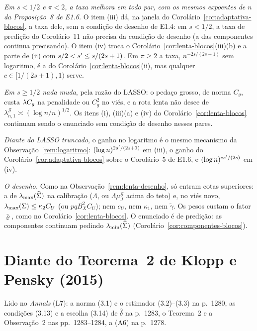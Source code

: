 \documentclass[11pt,a4paper]{article}
\newcommand{\lmin}{\lambda_{\min}}
\newcommand{\lmaxx}{\lambda_{\max}}
\newcommand{\gtil}{\widetilde{\gamma}}
\newcommand{\Gcal}{\mathcal{G}}
\newcommand{\lamGone}{\lambda^{\mathcal{G}}_{n,1}}
\begin{document}
\begin{remark}\label{rem:truncada-blocos}
\emph{Em $s < 1/2$ e $\pi < 2$, a taxa melhora em todo par, com os mesmos
expoentes de $n$ da Proposição~8 de E1.6.} O item (iii) dá, na janela do
Corolário~\ref{cor:adaptativa-blocos}, a taxa dele, sem a condição de desenho
de E1.4: em $s < 1/2$, a taxa de predição do Corolário~11 não precisa da
condição de desenho (a das componentes continua precisando). O item (iv) troca o Corolário~\ref{cor:lenta-blocos}(iii)(b) e a
parte de (ii) com $s/2 < s' \le s/(2s+1)$. Em $\pi \ge 2$ a taxa,
$n^{-2s/(2s+1)}$ sem logaritmo, é a do Corolário~\ref{cor:lenta-blocos}(ii),
mas qualquer $c \in [1/(2s+1),1)$ serve.

\emph{Em $s \ge 1/2$ nada muda}, pela razão do LASSO: o pedaço grosso, de
norma $C_{g}$, custa $\lambda C_{g}$ na penalidade ou $C_{g}^{2}$ no viés, e a
rota lenta não desce de $\lamGone \asymp (\log n/n)^{1/2}$. Os itens (i),
(iii)(a) e (iv) do Corolário~\ref{cor:lenta-blocos} continuam sendo o
enunciado sem condição de desenho nesses pares.

\emph{Diante do LASSO truncado}, o ganho no logaritmo é o mesmo mecanismo da
Observação~\ref{rem:logaritmo}: $(\log n)^{2s'/(2s+1)}$ em (iii), o ganho
do Corolário~\ref{cor:adaptativa-blocos} sobre o Corolário~5 de E1.6, e
$(\log n)^{es'/(2s)}$ em (iv).

\emph{O desenho.} Como na Observação~\ref{rem:lenta-desenho}, só entram cotas
superiores: a de $\lmaxx(\Gramhat)$ na calibração ($\Lambda$, ou
$\Lambda\mu^{\Gcal}_{J}$ acima do teto) e, no viés novo,
$\lmaxx(\Gram) \le \kappa_{2}C_{U}$ (ou $pqB_{X}^{2}C_{U}$); nem $c_{U}$, nem
$\kappa_{1}$, nem $\gtil$. Os pesos custam o fator $\bar\varrho$, como no
Corolário~\ref{cor:lenta-blocos}. O enunciado é de predição: as componentes
continuam pedindo $\lmin(\Gramhat)$ (Corolário~\ref{cor:componentes-blocos}).
\end{remark}

\section{Diante do Teorema~2 de Klopp e Pensky (2015)}\label{sec:kp}

Lido no \emph{Annals} (L7): a norma (3.1) e o estimador (3.2)--(3.3) na
p.~1280, as condições (3.13) e a escolha (3.14) de $\widehat\delta$ na
p.~1283, o Teorema~2 e a Observação~2 nas pp.~1283--1284, a (A6) na p.~1278.
\end{document}
